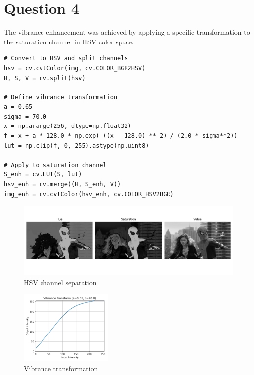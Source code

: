 \documentclass[10pt,a4paper]{article}
\begin{document}
\newpage

\section{Question 4}
The vibrance enhancement was achieved by applying a specific transformation to the saturation channel in HSV color space.

\begin{lstlisting}[caption=Vibrance enhancement]
# Convert to HSV and split channels
hsv = cv.cvtColor(img, cv.COLOR_BGR2HSV)
H, S, V = cv.split(hsv)

# Define vibrance transformation
a = 0.65
sigma = 70.0
x = np.arange(256, dtype=np.float32)
f = x + a * 128.0 * np.exp(-((x - 128.0) ** 2) / (2.0 * sigma**2))
lut = np.clip(f, 0, 255).astype(np.uint8)

# Apply to saturation channel
S_enh = cv.LUT(S, lut)
hsv_enh = cv.merge((H, S_enh, V))
img_enh = cv.cvtColor(hsv_enh, cv.COLOR_HSV2BGR)

\end{lstlisting}

\begin{figure}[H]
    \centering
    \includegraphics[width=\textwidth]{task4/hsv_planes.png}
    \caption{HSV channel separation}
\end{figure}
\begin{figure}[H]
    \centering
        \includegraphics[width=0.4\textwidth]{task4/transform_curve.png}
        \caption{Vibrance transformation}
\end{figure}
\end{document}
